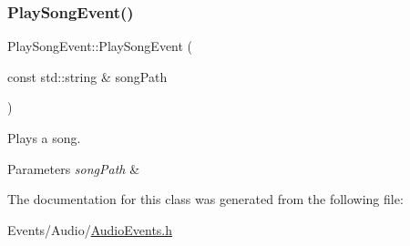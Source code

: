 \subsubsection{\texorpdfstring{Play\+Song\+Event()}{PlaySongEvent()}}
{\footnotesize\ttfamily Play\+Song\+Event\+::\+Play\+Song\+Event (\begin{DoxyParamCaption}\item[{const std\+::string \&}]{song\+Path }\end{DoxyParamCaption})\hspace{0.3cm}{\ttfamily [inline]}}



Plays a song. 


\begin{DoxyParams}{Parameters}
{\em song\+Path} & \\
\hline
\end{DoxyParams}


The documentation for this class was generated from the following file\+:\begin{DoxyCompactItemize}
\item 
Events/\+Audio/\hyperlink{AudioEvents_8h}{Audio\+Events.\+h}\end{DoxyCompactItemize}
